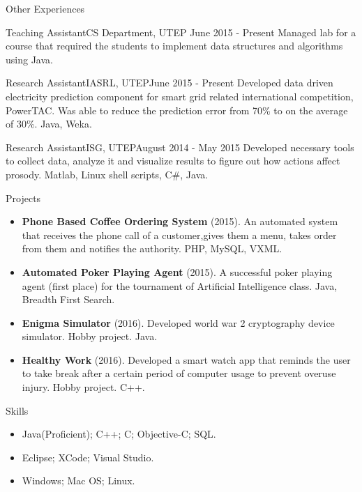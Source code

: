 \documentclass[]{mcdowellcv}
\begin{document}
	\begin{cvsection}{Other Experiences}
		\begin{cvsubsection}{Teaching Assistant}{CS Department, UTEP }{June 2015 - Present}
			Managed lab for a course that required the students to implement data structures and algorithms using Java.
		\end{cvsubsection}
		\begin{cvsubsection}{Research Assistant}{IASRL, UTEP}{June 2015 - Present}
			Developed data driven electricity prediction component for smart grid related international competition, PowerTAC. Was able to reduce the prediction error from 70\% to on the average of 30\%. Java, Weka.
		\end{cvsubsection}
		
		\begin{cvsubsection}{Research Assistant}{ISG, UTEP}{August 2014 - May 2015} 
			Developed necessary tools to collect data, analyze it and visualize results to figure out how actions affect prosody. Matlab, Linux shell scripts, C\#, Java.
		\end{cvsubsection}
	\end{cvsection}
	
	
	\begin{cvsection}{Projects}
		\begin{cvsubsection}{}{}{}
			\begin{itemize}
				\item \textbf{Phone Based Coffee Ordering System} (2015). An automated system that receives the phone call of a customer,gives them a menu, takes order from them and notifies the authority.  PHP, MySQL, VXML.
				\item \textbf{Automated Poker Playing Agent} (2015). A successful poker playing agent (first place) for the tournament of Artificial Intelligence class.  Java, Breadth First Search.
				\item \textbf{Enigma Simulator} (2016).  Developed world war 2 cryptography device simulator. Hobby project.  Java.
				\item \textbf{Healthy Work} (2016). Developed a smart watch app that reminds the user to take break after a certain period of computer usage to prevent overuse injury. Hobby project. C++.
			\end{itemize}
		\end{cvsubsection}
	\end{cvsection}
	
	
	\begin{cvsection}{Skills}
		\begin{cvsubsection}{}{}{}	
			\begin{itemize}
				\item Java(Proficient); C++; C; Objective-C; SQL.  
				\item Eclipse; XCode; Visual Studio.
				\item Windows; Mac OS; Linux. 
			\end{itemize}
		\end{cvsubsection}
	\end{cvsection}
	
\end{document}
